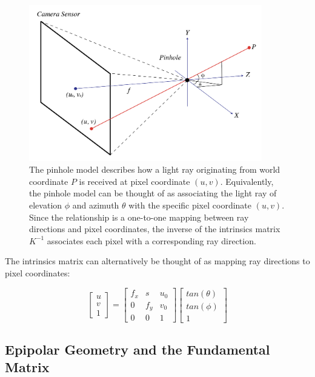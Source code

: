 \documentclass[openany]{book}
\begin{document}
\begin{figure}[htbp]
    \centering 
    \includegraphics[width=4in]{images/pinhole.png}
    \caption{The pinhole model describes how a light ray originating from world coordinate $P$ is received at pixel coordinate $(u, v)$. Equivalently, the pinhole model can be thought of as associating the light ray of elevation $\phi$ and azimuth $\theta$ with the specific pixel coordinate $(u, v)$. Since the relationship is a one-to-one mapping between ray directions and pixel coordinates, the inverse of the intrinsics matrix $K^{-1}$ associates each pixel with a corresponding ray direction.}
\end{figure}

The intrinsics matrix can alternatively be thought of as mapping ray directions to pixel coordinates:

\begin{equation}
    \begin{bmatrix}
        u\\
        v\\
        1
    \end{bmatrix} = 
    \begin{bmatrix}
        f_x & s & u_0 \\ 
        0 & f_y  & v_0 \\ 
        0 & 0 & 1 
    \end{bmatrix}
    \begin{bmatrix}
        tan(\theta) \\
        tan(\phi) \\
        1
    \end{bmatrix}
    \end{equation}


\subsection{Epipolar Geometry and the Fundamental Matrix}
\end{document}

